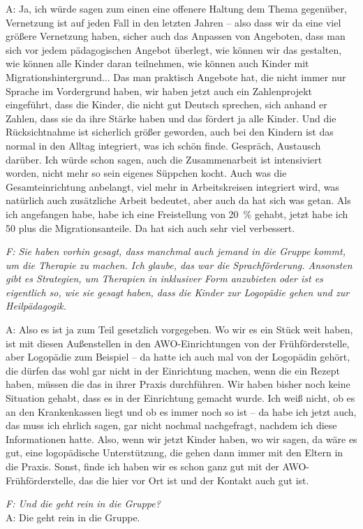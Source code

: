 \begin{linenumbers*}
A: Ja, ich würde sagen zum einen eine offenere Haltung dem Thema gegenüber, Vernetzung ist auf jeden Fall in den letzten Jahren -- also dass wir da eine viel größere Vernetzung haben, sicher auch das Anpassen von Angeboten, dass man sich vor jedem pädagogischen Angebot überlegt, wie können wir das gestalten, wie können alle Kinder daran teilnehmen, wie können auch Kinder mit Migrationshintergrund... Das man praktisch Angebote hat, die nicht immer nur Sprache im Vordergrund haben, wir haben jetzt auch ein  Zahlenprojekt eingeführt, dass die Kinder, die nicht gut Deutsch sprechen, sich anhand er Zahlen, dass sie da ihre Stärke haben und das fördert ja alle Kinder. Und die Rücksichtnahme ist sicherlich größer geworden, auch bei den Kindern ist das normal in den Alltag integriert, was ich schön finde. Gespräch, Austausch darüber. Ich würde schon sagen, auch die Zusammenarbeit ist intensiviert worden, nicht mehr so sein eigenes Süppchen kocht. Auch was die Gesamteinrichtung anbelangt, viel mehr in Arbeitskreisen integriert wird, was natürlich auch zusätzliche Arbeit bedeutet, aber auch da hat sich was getan. Als ich angefangen habe, habe ich eine Freistellung von 20~\% gehabt, jetzt habe ich 50 plus die Migrationsanteile. Da hat sich auch sehr viel verbessert. 

\emph{F: Sie haben vorhin gesagt, dass manchmal auch jemand in die Gruppe kommt, um die Therapie zu machen. Ich glaube, das war die Sprachförderung. Ansonsten gibt es Strategien, um Therapien in inklusiver Form anzubieten oder ist es eigentlich so, wie sie gesagt haben, dass die Kinder zur Logopädie gehen und zur Heilpädagogik.}

A: Also es ist ja zum Teil gesetzlich vorgegeben. Wo wir es ein Stück weit haben, ist mit diesen Außenstellen in den AWO-Einrichtungen von der Frühförderstelle, aber Logopädie zum Beispiel -- da hatte ich auch mal von der Logopädin gehört, die dürfen das wohl gar nicht in der Einrichtung machen, wenn die ein Rezept haben, müssen die das in ihrer Praxis durchführen. Wir haben bisher noch keine Situation gehabt, dass es in der Einrichtung gemacht wurde. Ich weiß nicht, ob es an den Krankenkassen liegt und ob es immer noch so ist -- da habe ich jetzt auch, das muss ich ehrlich sagen, gar nicht nochmal nachgefragt, nachdem ich diese Informationen hatte. Also, wenn wir jetzt Kinder haben, wo wir sagen, da wäre es gut, eine logopädische Unterstützung, die gehen dann immer mit den Eltern in die Praxis. Sonst, finde ich haben wir es schon ganz gut mit der AWO-Frühförderstelle, das die hier vor Ort ist und der Kontakt auch gut ist.

\emph{F: Und die geht rein in die Gruppe?}\\
A: Die geht rein in die Gruppe. 
\end{linenumbers*}
       
